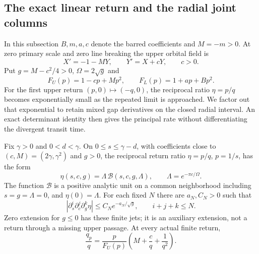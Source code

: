 \subsection{The exact linear return and the radial joint columns}
\label{rw:app:joint}

In this subsection $B,m,a,c$ denote the barred coefficients and
$M=-m>0$. At zero primary scale and zero line breaking the upper
orbital field is
\begin{equation}\label{rw:joint:linear-upper}
 X'=-1-MY,\qquad Y'=X+cY,\qquad c>0.
\end{equation}
Put $g=M-c^2/4>0$, $\Omega=2\sqrt g$ and
\[
 F_U(p)=1-cp+Mp^2,\qquad F_L(p)=1+ap+Bp^2.
\]
For the first upper return $(p,0)\mapsto(-q,0)$, the reciprocal
ratio $\eta=p/q$ becomes exponentially small as the repeated limit
is approached. We factor out that exponential to retain mixed gap
derivatives on the closed radial interval. An exact determinant
identity then gives the principal rate without differentiating the
divergent transit time.

\begin{lemma}\label{rw:joint:exact-linear-rate}
Fix $\gamma>0$ and $0<d<\gamma$. On
$0\le s\le\gamma-d$, with coefficients close to
$(c,M)=(2\gamma,\gamma^2)$ and $g>0$, the reciprocal return ratio
$\eta=p/q$, $p=1/s$, has the form
\begin{equation}\label{rw:joint:eta-unit}
 \eta(s,c,g)=\Lambda\,\mathcal B(s,c,g,\Lambda),\qquad
 \Lambda=e^{-\pi c/\Omega}.
\end{equation}
The function $\mathcal B$ is a positive analytic unit on a common
neighborhood including $s=g=\Lambda=0$, and $\eta(0)=\Lambda$.
For each fixed $N$ there are $a_N,C_N>0$ such that
\[
 |\partial_s^i\partial_c^j\partial_g^k\eta|
 \le C_Ne^{-a_N/\sqrt g},\qquad i+j+k\le N.
\]
Zero extension for $g\le0$ has these finite jets; it is an auxiliary
extension, not a return through a missing upper passage. At every
actual finite return,
\begin{equation}\label{rw:joint:linear-rate}
 \frac{q_p}{q}
   =\frac p{F_U(p)}\left(M+\frac cq+\frac1{q^2}\right).
\end{equation}
\end{lemma}

